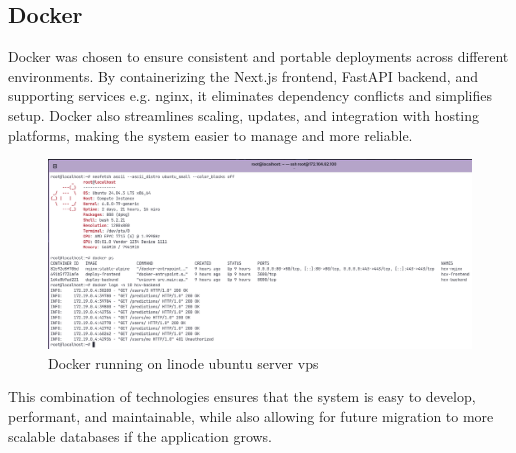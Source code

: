 \subsection*{Docker}
Docker was chosen to ensure consistent and portable deployments across different environments.
By containerizing the Next.js frontend, FastAPI backend, and supporting services e.g. nginx,
it eliminates dependency conflicts and simplifies setup. Docker also streamlines scaling,
updates, and integration with hosting platforms, making the system easier to manage
and more reliable.
\begin{figure}[htbp]
  \begin{center}
    \includegraphics[width=\textwidth]{figures/docker.png}
  \end{center}
  \caption{Docker running on linode ubuntu server vps}\label{fig:docker}
\end{figure}


This combination of technologies ensures that the system is easy to develop, performant,
and maintainable, while also allowing for future migration to more scalable databases if the application grows.
